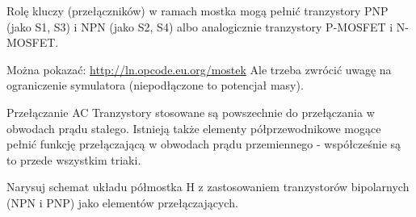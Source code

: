 \documentclass{pdfBooklets}
\begin{document}
Rolę kluczy (przełączników) w ramach mostka mogą pełnić tranzystory PNP (jako S1, S3) i NPN (jako S2, S4) albo analogicznie tranzystory P-MOSFET i N-MOSFET.

\begin{teacherOnly}
Można pokazać: \url{http://ln.opcode.eu.org/mostek}
Ale trzeba zwrócić uwagę na ograniczenie symulatora (niepodłączone to potencjał masy).
\end{teacherOnly}

\begin{ProTip}{Przełączanie AC}
Tranzystory stosowane są powszechnie do przełączania w obwodach prądu stałego. Istnieją także elementy półprzewodnikowe mogące pełnić funkcję przełączającą w obwodach prądu przemiennego - współcześnie są to przede wszystkim triaki.
\end{ProTip}

% 

\begin{Zadanie}{}{}
Narysuj schemat układu półmostka H z zastosowaniem tranzystorów bipolarnych (NPN i PNP) jako elementów przełączających.
\end{Zadanie}

\end{document}
